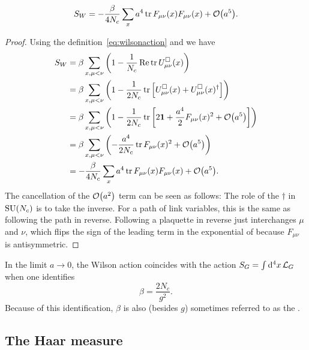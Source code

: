 \begin{proposition}{}{} 
  $$S_W=-\frac{\beta}{4N_c}\sum_x a^4\tr F_{\mu\nu}(x)F_{\mu\nu}(x)
                  +\order{a^5}.$$
  \begin{proof} Using the definition~\eqref{eq:wilsonaction} and
     we have
    \begin{equation*}
    \begin{aligned}
      S_W&=\beta\sum_{x,\mu<\nu}\left(1-\frac{1}{N_c}\Re\tr 
            U_{\mu\nu}^\Box(x)\right)\\
         &=\beta\sum_{x,\mu<\nu}\left(1-\frac{1}{2N_c}\tr 
            \left[U_{\mu\nu}^\Box(x)+
            U_{\mu\nu}^\Box(x)^\dagger\right]\right)\\
         &=\beta\sum_{x,\mu<\nu}\left(1-\frac{1}{2N_c}\tr
            \left[2\id+\frac{a^4}{2}F_{\mu\nu}(x)^2
                  +\order{a^5}\right]\right)\\
         &=\beta\sum_{x,\mu<\nu}\left(-\frac{a^4}{2N_c}\tr F_{\mu\nu}(x)^2
                  +\order{a^5}\right)\\
         &=-\frac{\beta}{4N_c}\sum_x a^4\tr F_{\mu\nu}(x)F_{\mu\nu}(x)
                  +\order{a^5}.
    \end{aligned}
    \end{equation*}
    The cancellation of the $\order{a^2}$ term can be seen
    as follows: The role of the $\dagger$ in $\operatorname{SU}(N_c)$ is to take the inverse.
    For a path of link variables, this is the same as following the path
    in reverse.
    Following a plaquette in reverse just interchanges $\mu$ and $\nu$,
    which flips the sign of the leading term in the exponential
    of  because $F_{\mu\nu}$
    is antisymmetric.
  \end{proof}
\end{proposition}

In the limit $a\to0$, the Wilson action coincides with the action
$S_G=\int \dd^4x\,\mathcal{L}_G$ when one identifies 
\begin{equation}
  \beta=\frac{2N_c}{g^2}.
\end{equation}
Because of this identification, $\beta$ is also (besides $g$) sometimes 
referred to as the .


\subsection{The Haar measure}\label{sec:haar}

